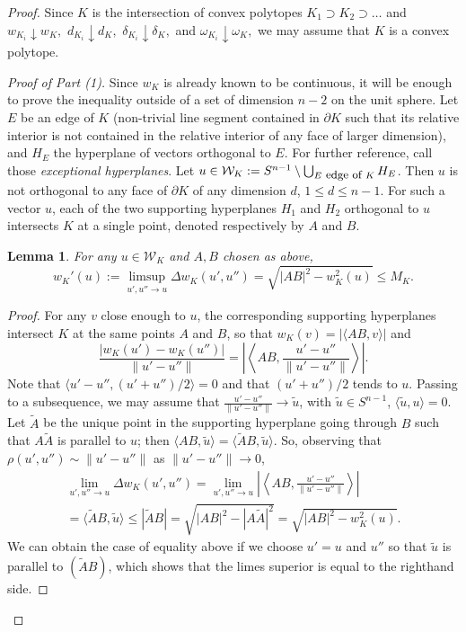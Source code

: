 \documentclass[a4paper,12pt]{amsart}
\newtheorem{lemma}[thm]{Lemma}
\def\om{\omega}
\def\d{\delta}
\begin{document}
\begin{proof}

Since $K$ is the intersection of convex polytopes $K_1\supset K_2\supset\dots$
and $w_{K_i}\downarrow w_K,$ $d_{K_i}\downarrow d_K,$ $\d_{K_i}\downarrow\d_K,$ and
$\om_{K_i}\downarrow\om_K,$ we may assume that $K$ is a convex polytope.
\smallskip

{\it Proof of Part (1).} Since $w_K$ is already known to be
continuous, it will be enough to prove the inequality outside of a
set of dimension $n-2$ on the unit sphere. Let $E$ be an edge of
$K$ (non-trivial line segment contained in $\partial K$ such that
its relative interior is not contained in the relative interior of
any face of larger dimension), and $H_E$ the  hyperplane of
vectors orthogonal to $E$. For further reference, call those
\emph{exceptional hyperplanes}. Let $u\in \mathcal W_K := S^{n-1}
\setminus \bigcup_{E \mbox{ \small edge of }K} H_E$.  Then $u$ is
not orthogonal to any face of $\partial K$ of any dimension $d$,
$1\le d\le n-1$. For such a vector $u$, each of the two supporting
hyperplanes $H_1$ and $H_2$ orthogonal to $u$ intersects $K$ at a
single point, denoted respectively by $A$ and $B$.

\begin{lemma}
\label{limw}
For any $u \in \mathcal W_K$ and $A, B$ chosen as above,
\[
w_K'(u):= \limsup_{u',u''\to u} \Delta w_K(u',u'')
= \sqrt{|AB|^2-w^2_K(u)} \le M_K.
\]
\end{lemma}
\begin{proof}
For any $v$ close enough to $u$, the corresponding supporting
hyperplanes intersect $K$ at the same points $A$ and $B$, so that
$w_K(v)= |\langle AB, v\rangle|$ and
\[
\frac{|w_K(u')-w_K(u'')|}{\|u'-u''\|} = \left| \left\langle AB, \frac{u'-u''}{\|u'-u''\|}\right\rangle\right|.
\]
Note that $\langle u'-u'', (u'+u'')/2 \rangle=0$ and that $(u'+u'')/2$ tends to $u$.
Passing to a subsequence, we may assume that $\frac{u'-u''}{\|u'-u''\|} \to \tilde u$, with
$\tilde u \in S^{n-1}$, $\langle \tilde u, u \rangle=0$.
Let $\tilde A$ be the
unique point in  the supporting hyperplane going through $B$
such that $A\tilde A$ is parallel to $u$; then $\langle AB, \tilde u\rangle = \langle \tilde AB, \tilde u\rangle$.
So, observing that $\rho(u',u'') \sim \|u'-u''\|$ as $\|u'-u''\|\to0$,
\begin{multline*}
\lim_{u',u''\to u} \Delta w_K(u',u'') =
\lim_{u',u''\to u}\left| \left\langle AB, \frac{u'-u''}{\|u'-u''\|}\right\rangle\right|
\\
= \langle \tilde AB, \tilde u\rangle \le |\tilde AB| = \sqrt{|AB|^2-|A\tilde A|^2} =
\sqrt{|AB|^2-w^2_K(u)}.
\end{multline*}
We can obtain the case of equality above if we choose $u'=u$ and $u''$ so that $\tilde u$
is parallel to $(\tilde A B)$, which shows that the limes superior is equal to the righthand
side.
\end{proof}


\end{proof}
\end{document}
